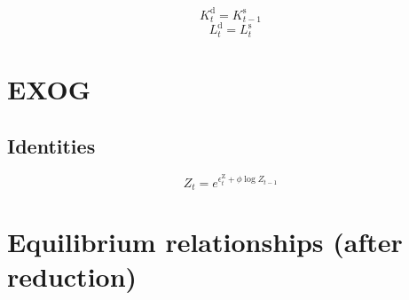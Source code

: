 \begin{equation}
K^{\mathrm{d}}_{t} = K^{\mathrm{s}}_{t-1}
\end{equation}
\begin{equation}
L^{\mathrm{d}}_{t} = L^{\mathrm{s}}_{t}
\end{equation}




\section{EXOG}

\subsection{Identities}

\begin{equation}
Z_{t} = e^{\epsilon^{\mathrm{Z}}_{t} + {\phi} {\log{Z_{t-1}}}}
\end{equation}




\section{Equilibrium relationships (after reduction)}


